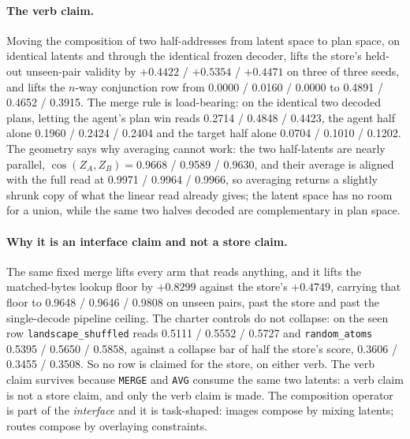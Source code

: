 \documentclass{article}
\begin{document}
\paragraph{The verb claim.} Moving the composition of two half-addresses from latent space to
plan space, on identical latents and through the identical frozen decoder, lifts the store's
held-out unseen-pair validity by $+0.4422$ / $+0.5354$ / $+0.4471$ on three of three seeds, and
lifts the $n$-way conjunction row from 0.0000 / 0.0160 / 0.0000 to 0.4891 / 0.4652 / 0.3915.
The merge rule is load-bearing: on the identical two decoded plans, letting the agent's plan
win reads 0.2714 / 0.4848 / 0.4423, the agent half alone 0.1960 / 0.2424 / 0.2404 and the target
half alone 0.0704 / 0.1010 / 0.1202.
The geometry says why averaging cannot work: the two half-latents are nearly parallel,
$\cos(Z_A,Z_B)=0.9668$ / 0.9589 / 0.9630, and their average is aligned with the full read at
0.9971 / 0.9964 / 0.9966, so averaging returns a slightly shrunk copy of what the linear read
already gives; the latent space has no room for a union, while the same two halves decoded are
complementary in plan space.

\paragraph{Why it is an interface claim and not a store claim.} The same fixed merge lifts every
arm that reads anything, and it lifts the matched-bytes lookup floor by $+0.8299$ against the
store's $+0.4749$, carrying that floor to 0.9648 / 0.9646 / 0.9808 on unseen pairs, past the
store and past the single-decode pipeline ceiling.
The charter controls do not collapse: on the seen row \texttt{landscape\_shuffled} reads 0.5111
/ 0.5552 / 0.5727 and \texttt{random\_atoms} 0.5395 / 0.5650 / 0.5858, against a collapse bar of
half the store's score, 0.3606 / 0.3455 / 0.3508.
So no row is claimed for the store, on either verb. The verb claim survives because
\texttt{MERGE} and \texttt{AVG} consume the same two latents: a verb claim is not a store claim,
and only the verb claim is made. The composition operator is part of the \emph{interface} and it
is task-shaped: images compose by mixing latents; routes compose by overlaying constraints.
\end{document}
